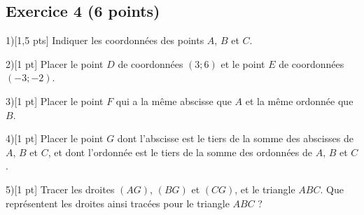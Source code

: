\documentclass[14pt]{extreport}
\theoremstyle{plain}
\begin{document}
\subsection*{Exercice 4 (6 points)}

\begin{figure}[H]\center
{}
\end{figure}
1)[1,5 pts] Indiquer les coordonnées des points $A$, $B$ et $C$. 

2)[1 pt] Placer le point $D$ de coordonnées $(3; 6)$ et le point $E$ de coordonnées $(-3; -2)$. 

3)[1 pt] Placer le point $F$ qui a la même abscisse que $A$ et la même 
ordonnée que $B$. 



4)[1 pt] Placer le point $G$ dont l'abscisse est le tiers de la somme des 
abscisses de $A$, $B$ et $C$, et dont l'ordonnée est le tiers de la 
somme des ordonnées de $A$, $B$ et $C$. 

5)[1 pt] Tracer les droites $(AG)$, $(BG)$ et $(CG)$, et le triangle $ABC$. Que représentent les droites ainsi tracées pour le triangle $ABC$ ?
\newpage 

 
\end{document}
